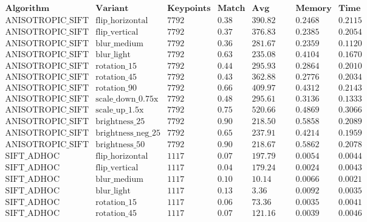 \documentclass[conference]{IEEEtran}
\begin{document}
$$\begin{array}{|l|l|c|c|c|c|c|}
\hline
\textbf{Algorithm} & \textbf{Variant} & \textbf{Keypoints} & \textbf{Match Ratio} & \textbf{Avg Distance} & \textbf{Memory (MB)} & \textbf{Time (hrs)} \\ \hline
\text{ANISOTROPIC\_SIFT} & \text{flip\_horizontal} & 7792 & 0.38 & 390.82 & 0.2468 & 0.2115 \\
\text{ANISOTROPIC\_SIFT} & \text{flip\_vertical} & 7792 & 0.37 & 376.83 & 0.2385 & 0.2054 \\
\text{ANISOTROPIC\_SIFT} & \text{blur\_medium} & 7792 & 0.36 & 281.67 & 0.2359 & 0.1120 \\
\text{ANISOTROPIC\_SIFT} & \text{blur\_light} & 7792 & 0.63 & 235.08 & 0.4104 & 0.1670 \\
\text{ANISOTROPIC\_SIFT} & \text{rotation\_15} & 7792 & 0.44 & 295.93 & 0.2864 & 0.2010 \\
\text{ANISOTROPIC\_SIFT} & \text{rotation\_45} & 7792 & 0.43 & 362.88 & 0.2776 & 0.2034 \\
\text{ANISOTROPIC\_SIFT} & \text{rotation\_90} & 7792 & 0.66 & 409.97 & 0.4312 & 0.2143 \\
\text{ANISOTROPIC\_SIFT} & \text{scale\_down\_0.75x} & 7792 & 0.48 & 295.61 & 0.3136 & 0.1333 \\
\text{ANISOTROPIC\_SIFT} & \text{scale\_up\_1.5x} & 7792 & 0.75 & 520.66 & 0.4869 & 0.3066 \\
\text{ANISOTROPIC\_SIFT} & \text{brightness\_25} & 7792 & 0.90 & 218.50 & 0.5858 & 0.2089 \\
\text{ANISOTROPIC\_SIFT} & \text{brightness\_neg\_25} & 7792 & 0.65 & 237.91 & 0.4214 & 0.1959 \\
\text{ANISOTROPIC\_SIFT} & \text{brightness\_50} & 7792 & 0.90 & 218.67 & 0.5862 & 0.2078 \\ \hline
\text{SIFT\_ADHOC} & \text{flip\_horizontal} & 1117 & 0.07 & 197.79 & 0.0054 & 0.0044 \\
\text{SIFT\_ADHOC} & \text{flip\_vertical} & 1117 & 0.04 & 179.24 & 0.0024 & 0.0043 \\
\text{SIFT\_ADHOC} & \text{blur\_medium} & 1117 & 0.10 & 10.14 & 0.0066 & 0.0021 \\
\text{SIFT\_ADHOC} & \text{blur\_light} & 1117 & 0.13 & 3.36 & 0.0092 & 0.0035 \\
\text{SIFT\_ADHOC} & \text{rotation\_15} & 1117 & 0.06 & 73.36 & 0.0035 & 0.0041 \\
\text{SIFT\_ADHOC} & \text{rotation\_45} & 1117 & 0.07 & 121.16 & 0.0039 & 0.0046 \\

\end{array}$$
\end{document}
